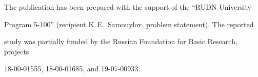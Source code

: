 












\vspace*{-20pt}





\Ack


\noindent


 The publication has been prepared with the support of the ``RUDN University 


Program 5-100'' (recipient K.\,E.~Samouylov, problem statement). The reported 


study was partially funded by the Russian Foundation for Basic Research, projects  


18-00-01555, 18-00-01685, and 19-07-00933.








\vspace*{5pt}





